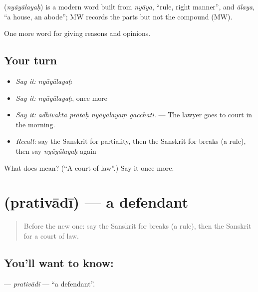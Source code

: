 \begin{cousinweb}
\textbf{} (\emph{nyāyālayaḥ}) is a modern word built from \emph{nyāya}, \textquotedblleft{}rule, right manner\textquotedblright{}, and \emph{ālaya}, \textquotedblleft{}a house, an abode\textquotedblright{}; MW records the parts but not the compound (MW).
\end{cousinweb}

\begin{grammarlens}[title={What you've built}]
One more word for giving reasons and opinions.
\end{grammarlens}

\subsection*{Your turn}
\begin{itemize}
\raggedright
  \item \emph{Say it:} \emph{nyāyālayaḥ}
  \item \emph{Say it:} \emph{nyāyālayaḥ}, once more
  \item \emph{Say it:} \emph{adhivaktā prātaḥ nyāyālayaṃ gacchati.} — The lawyer goes to court in the morning.
  \item \emph{Recall:} say the Sanskrit for partiality, then the Sanskrit for breaks (a rule), then say \emph{nyāyālayaḥ} again
\end{itemize}

\begin{tcolorbox}[breakable,colback=teal!4,colframe=teal!35!black,title={Before you move on}]
What does  mean? (\textquotedblleft{}A court of law\textquotedblright{}.) Say it once more.
\end{tcolorbox}
\section[\texorpdfstring{\sk{प्रतिवादी} (prativādī)}{प्रतिवादी (prativādī)}]{ (prativādī) — a defendant}

\label{lesson:SA-C349-prativadi}



\begin{quote}
Before the new one: say the Sanskrit for breaks (a rule), then the Sanskrit for a court of law.
\end{quote}

\subsection*{You'll want to know: }
\textbf{} — \emph{prativādī} — \textquotedblleft{}a defendant\textquotedblright{}.

